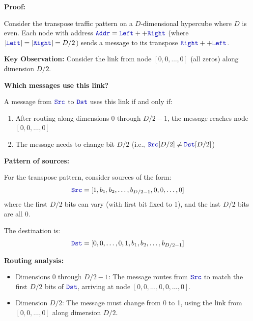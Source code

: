 \documentclass{article}
\newenvironment{answer}
{\color{blue}}
{\normalfont}
\begin{document}
\begin{enumerate}
\begin{enumerate}
                    \begin{answer}
                        \textbf{Proof:}

                        Consider the transpose traffic pattern on a $D$-dimensional hypercube where $D$ is even.
                        Each node with address $\code{Addr} = \code{Left} ++ \code{Right}$ (where $|\code{Left}| = |\code{Right}| = D/2$)
                        sends a message to its transpose $\code{Right} ++ \code{Left}$.

                        \textbf{Key Observation:} Consider the link from node $[0,0,\ldots,0]$ (all zeros) along dimension $D/2$.

                        \textbf{Which messages use this link?}

                        A message from $\code{Src}$ to $\code{Dst}$ uses this link if and only if:
                        \begin{enumerate}
                            \item After routing along dimensions $0$ through $D/2-1$, the message reaches node $[0,0,\ldots,0]$
                            \item The message needs to change bit $D/2$ (i.e., $\code{Src}[D/2] \neq \code{Dst}[D/2]$)
                        \end{enumerate}

                        \textbf{Pattern of sources:}

                        For the transpose pattern, consider sources of the form:
                        $$\code{Src} = [1, b_1, b_2, \ldots, b_{D/2-1}, 0, 0, \ldots, 0]$$
                        where the first $D/2$ bits can vary (with first bit fixed to 1), and the last $D/2$ bits are all 0.

                        The destination is:
                        $$\code{Dst} = [0, 0, \ldots, 0, 1, b_1, b_2, \ldots, b_{D/2-1}]$$

                        \textbf{Routing analysis:}
                        \begin{itemize}
                            \item Dimensions 0 through $D/2-1$: The message routes from $\code{Src}$ to match the first $D/2$ bits of $\code{Dst}$,
                                  arriving at node $[0,0,\ldots,0,0,\ldots,0]$.
                            \item Dimension $D/2$: The message must change from 0 to 1, using the link from $[0,0,\ldots,0]$ along dimension $D/2$.
                        \end{itemize}


\end{answer}
\end{enumerate}
\end{enumerate}
\end{document}
